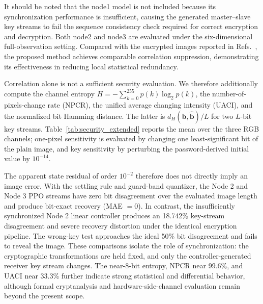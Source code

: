 \documentclass[10pt,twocolumn]{article}
\newcommand{\rev}[1]{{\color{revisionblue}#1}}
\theoremstyle{definition}
\begin{document}
It should be noted that the node1 model is not included because its synchronization performance is insufficient, causing the generated master--slave key streams to fail the sequence consistency check required for correct encryption and decryption. Both node2 and node3 are evaluated under the six-dimensional full-observation setting. Compared with the encrypted images reported in Refs.~\cite{li2024novel,verma2025quantum}, the proposed method achieves comparable correlation suppression, demonstrating its effectiveness in reducing local statistical redundancy.

\rev{Correlation alone is not a sufficient security evaluation. We therefore additionally compute the channel entropy $H=-\sum_{k=0}^{255}p(k)\log_2p(k)$, the number-of-pixels-change rate (NPCR), the unified average changing intensity (UACI), and the normalized bit Hamming distance. The latter is $d_H(\mathbf b,\hat{\mathbf b})/L$ for two $L$-bit key streams. Table~\ref{tab:security_extended} reports the mean over the three RGB channels; one-pixel sensitivity is evaluated by changing one least-significant bit of the plain image, and key sensitivity by perturbing the password-derived initial value by $10^{-14}$.}

\begin{table}[htbp]
\centering
\caption{\rev{Extended security, key-consistency, and recovery evaluation.}}
\label{tab:security_extended}
\setlength{\tabcolsep}{5pt}
\end{table}

\rev{The apparent state residual of order $10^{-2}$ therefore does not directly imply an image error. With the settling rule and guard-band quantizer, the Node 2 and Node 3 PPO streams have zero bit disagreement over the evaluated image length and produce bit-exact recovery (MAE $=0$). In contrast, the insufficiently synchronized Node 2 linear controller produces an 18.742\% key-stream disagreement and severe recovery distortion under the identical encryption pipeline. The wrong-key test approaches the ideal 50\% bit disagreement and fails to reveal the image. These comparisons isolate the role of synchronization: the cryptographic transformations are held fixed, and only the controller-generated receiver key stream changes. The near-8-bit entropy, NPCR near 99.6\%, and UACI near 33.3\% further indicate strong statistical and differential behavior, although formal cryptanalysis and hardware-side-channel evaluation remain beyond the present scope.}
\end{document}
